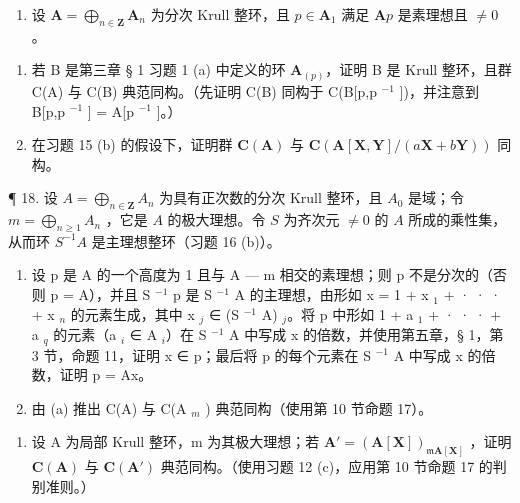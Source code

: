 \begin{enumerate}
\def\labelenumi{\arabic{enumi}.}
\setcounter{enumi}{16}
\tightlist
\item
  设 \(\mathbf{A} = \bigoplus_{n\in \mathbf{Z}}\mathbf{A}_n\) 为分次 Krull 整环，且 \(p\in \mathbf{A}_1\) 满足 \(\mathbf{A}p\) 是素理想且 \(\neq 0\) 。
\end{enumerate}

\begin{enumerate}
\def\labelenumi{(\alph{enumi})}
\item
  若 B 是第三章 § 1 习题 1 (a) 中定义的环 \(\mathbf{A}_{(p)}\)，证明 B 是 Krull 整环，且群 C(A) 与 C(B) 典范同构。（先证明 C(B) 同构于 C(B{[}p,p \(^{-1}\) {]})，并注意到 B{[}p,p \(^{-1}\) {]} = A{[}p \(^{-1}\) {]}。）
\item
  在习题 15 (b) 的假设下，证明群 \(\mathbf{C}(\mathbf{A})\) 与 \(\mathbf{C}(\mathbf{A}[\mathbf{X},\mathbf{Y}] / (a\mathbf{X} + b\mathbf{Y}))\) 同构。
\end{enumerate}

¶ 18. 设 \(A = \bigoplus_{n \in \mathbf{Z}} A_n\) 为具有正次数的分次 Krull 整环，且 \(A_0\) 是域；令 \(m = \bigoplus_{n \geqslant 1} A_n\) ，它是 \(A\) 的极大理想。令 \(S\) 为齐次元 \(\neq 0\) 的 \(A\) 所成的乘性集，从而环 \(S^{-1}A\) 是主理想整环（习题 16 (b)）。

\begin{enumerate}
\def\labelenumi{(\alph{enumi})}
\item
  设 p 是 A 的一个高度为 1 且与 A --- m 相交的素理想；则 p 不是分次的（否则 p = A），并且 S \(^{-1}\) p 是 S \(^{-1}\) A 的主理想，由形如 x = 1 + x \(_{1}\) + · · · + x \(_{n}\) 的元素生成，其中 x \(_{j}\) ∈ (S \(^{-1}\) A) \(_{j}\)。将 p 中形如 1 + a \(_{1}\) + · · · + a \(_{q}\) 的元素（a \(_{i}\) ∈ A \(_{i}\)）在 S \(^{-1}\) A 中写成 x 的倍数，并使用第五章，§ 1，第 3 节，命题 11，证明 x ∈ p；最后将 p 的每个元素在 S \(^{-1}\) A 中写成 x 的倍数，证明 p = Ax。
\item
 由 (a) 推出 C(A) 与 C(A \(_{m}\) ) 典范同构（使用第 10 节命题 17）。
\end{enumerate}

\begin{enumerate}
\def\labelenumi{\arabic{enumi}.}
\setcounter{enumi}{18}
\tightlist
\item
  设 A 为局部 Krull 整环，m 为其极大理想；若 \(\mathbf{A}' = (\mathbf{A}[\mathbf{X}])_{\mathfrak{m}\mathbf{A}[\mathbf{X}]}\) ，证明 \(\mathbf{C}(\mathbf{A})\) 与 \(\mathbf{C}(\mathbf{A}')\) 典范同构。（使用习题 12 (c)，应用第 10 节命题 17 的判别准则。）
\end{enumerate}


